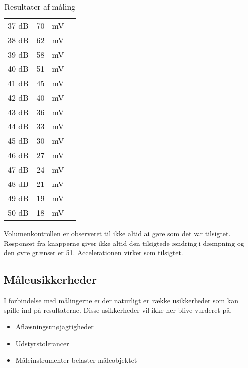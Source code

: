 \begin{table}[h]
\begin{tabular}{l|c|c|l}
37 dB & 70 & mV \\[4pt]
38 dB & 62 & mV \\[4pt]
39 dB & 58 & mV \\[4pt]
40 dB & 51 & mV \\[4pt]
41 dB & 45 & mV \\[4pt]
42 dB & 40 & mV \\[4pt]
43 dB & 36 & mV \\[4pt]
44 dB & 33 & mV \\[4pt]
45 dB & 30 & mV \\[4pt]
46 dB & 27 & mV \\[4pt]
47 dB & 24 & mV \\[4pt]
48 dB & 21 & mV \\[4pt]
49 dB & 19 & mV \\[4pt]
50 dB & 18 & mV \\
\hline\hline
\end{tabular}
\caption{Resultater af måling}
\label{tab:resultat_volumenkontrol}
\end{table}

Volumenkontrollen er observeret til ikke altid at gøre som det var tilsigtet. Responset fra knapperne giver ikke altid den tilsigtede ændring i dæmpning og den øvre grænser er 51. Accelerationen virker som tilsigtet.

\subsection*{Måleusikkerheder}
I forbindelse med målingerne er der naturligt en række usikkerheder som kan spille ind på resultaterne. Disse usikkerheder vil ikke her blive vurderet på. 

\begin{itemize}
\item Aflæsningsunøjagtigheder
\item Udstyrstolerancer
\item Måleinstrumenter belaster måleobjektet
\end{itemize}